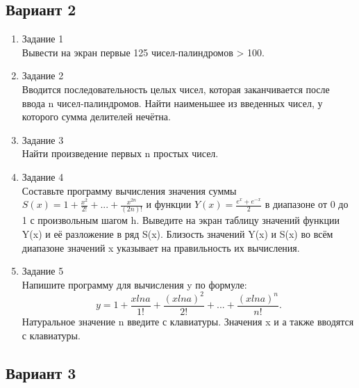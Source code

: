 \documentclass[a4paper]{article}
\begin{document}
	\begin{center}
		\subsection*{Вариант 2}
	\end{center}


	\begin{enumerate} 
		\item Задание 1 \\
			Вывести на экран первые 125 чисел-палиндромов > 100.\\
		\item Задание 2\\
			Вводится последовательность целых чисел, которая заканчивается после ввода n чисел-палиндромов.
			Найти наименьшее из введенных чисел, у которого сумма делителей нечётна.\\
		\item Задание 3 \\
			Найти произведение первых n простых чисел.\\
		\item Задание 4 \\
			Составьте программу вычисления значения суммы  $S(x)=1+\frac{x^2}{2!}+...+\frac{x^{2n}}{(2n)!}$
			и функции $Y(x)=\frac{e^x+e^{-x}}{2}$ в диапазоне от 0 до 1
			с произвольным шагом h. Выведите на экран таблицу значений функции Y(x) и её разложение в ряд S(x). Близость значений Y(x) и S(x) во всём диапазоне
			значений x указывает на правильность их вычисления.\\
		\item Задание 5 \\
			Напишите программу для вычисления y по формуле:
			$$y=1+\frac{xlna}{1!}+\frac{(xlna)^2}{2!}+...+\frac{(xlna)^n}{n!}.$$
			Натуральное значение n введите с клавиатуры. Значения x и а также вводятся с клавиатуры.\\
	\end{enumerate}

	\begin{center}
		\subsection*{Вариант 3}
	\end{center}
\end{document}
